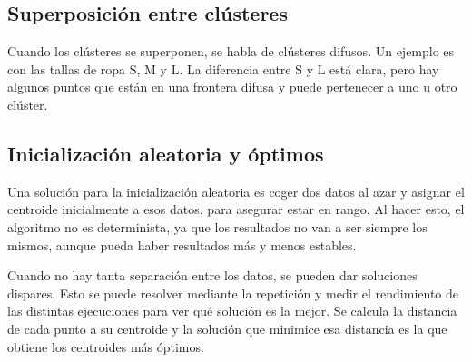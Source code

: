 \subsection{Superposición entre clústeres}
Cuando los clústeres se superponen, se habla de clústeres difusos. Un ejemplo es con las tallas de ropa S, M y L. La diferencia entre S y L está clara, pero hay algunos puntos que están en una frontera difusa y puede pertenecer a uno u otro clúster.

\subsection{Inicialización aleatoria y óptimos}
Una solución para la inicialización aleatoria es coger dos datos al azar y asignar el centroide inicialmente a esos datos, para asegurar estar en rango. Al hacer esto, el algoritmo no es determinista, ya que los resultados no van a ser siempre los mismos, aunque pueda haber resultados más y menos estables. 

Cuando no hay tanta separación entre los datos, se pueden dar soluciones dispares. Esto se puede resolver mediante la repetición y medir el rendimiento de las distintas ejecuciones para ver qué solución es la mejor. Se calcula la distancia de cada punto a su centroide y la solución que minimice esa distancia es la que obtiene los centroides más óptimos. 